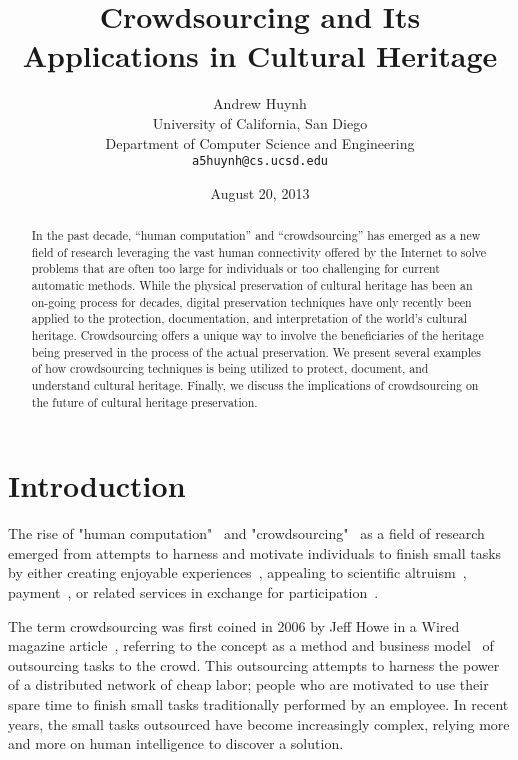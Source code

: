 \documentclass[10pt,twocolumn]{article}
\begin{document}
\title{
	Crowdsourcing and Its Applications in Cultural Heritage}

\author{
	Andrew Huynh\\
	University of California, San Diego\\
	Department of Computer Science and Engineering\\
	\texttt{a5huynh@cs.ucsd.edu}}

\date{August 20, 2013}

\maketitle

\begin{abstract}
In the past decade, ``human computation'' and ``crowdsourcing'' has emerged as 
a new field of research leveraging the vast human connectivity offered by 
the Internet to solve problems that are often too large for individuals or 
too challenging for current automatic methods. While the physical preservation 
of cultural heritage has been an on-going process for decades, digital 
preservation techniques have only recently been applied to the protection, 
documentation, and interpretation of the world's cultural heritage. 
Crowdsourcing offers a unique way to involve the beneficiaries of the heritage 
being preserved in the process of the actual preservation. We present several 
examples of how crowdsourcing techniques is being utilized to protect, 
document, and understand cultural heritage. Finally, we discuss the 
implications of crowdsourcing on the future of cultural heritage preservation.
\end{abstract}

\section{Introduction}
The rise of "human computation"~\cite{VonAhn2009} and 
"crowdsourcing"~\cite{Howe2006} as a field of research emerged from attempts to 
harness and motivate individuals to finish small tasks by either creating 
enjoyable experiences~\cite{VonAhn2008}, appealing to scientific 
altruism~\cite{Cooper2010}, payment~\cite{Kittur2008}, or related services in 
exchange for participation~\cite{Hull2006}. 

The term crowdsourcing was first coined in 2006 by Jeff Howe in a Wired 
magazine article~\cite{Howe2006}, referring to the concept as a method
and business model~\cite{Howe2008} of outsourcing tasks to the crowd. This 
outsourcing attempts to harness the power of a distributed network of cheap 
labor; people who are motivated to use their spare time to finish small tasks 
traditionally performed by an employee. In recent years, the small tasks outsourced 
have become increasingly complex, relying more and more on human intelligence 
to discover a solution.
\end{document}
